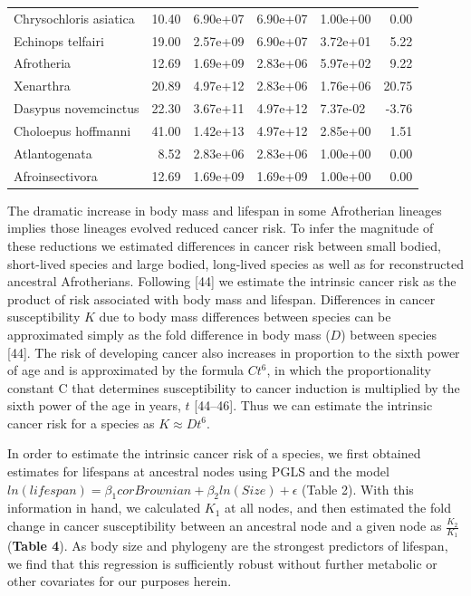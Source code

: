 \documentclass[]{elsarticle} %
\begin{document}
\begin{table}
{\begin{tabular}[t]{lrlllr}
Chrysochloris asiatica & 10.40 & 6.90e+07 & 6.90e+07 & 1.00e+00 & 0.00\\
Echinops telfairi & 19.00 & 2.57e+09 & 6.90e+07 & 3.72e+01 & 5.22\\
Afrotheria & 12.69 & 1.69e+09 & 2.83e+06 & 5.97e+02 & 9.22\\
Xenarthra & 20.89 & 4.97e+12 & 2.83e+06 & 1.76e+06 & 20.75\\
\addlinespace
Dasypus novemcinctus & 22.30 & 3.67e+11 & 4.97e+12 & 7.37e-02 & -3.76\\
Choloepus hoffmanni & 41.00 & 1.42e+13 & 4.97e+12 & 2.85e+00 & 1.51\\
Atlantogenata & 8.52 & 2.83e+06 & 2.83e+06 & 1.00e+00 & 0.00\\
Afroinsectivora & 12.69 & 1.69e+09 & 1.69e+09 & 1.00e+00 & 0.00\\
\bottomrule
\end{tabular}}
\end{table}

The dramatic increase in body mass and lifespan in some Afrotherian
lineages implies those lineages evolved reduced cancer risk. To infer
the magnitude of these reductions we estimated differences in cancer
risk between small bodied, short-lived species and large bodied,
long-lived species as well as for reconstructed ancestral Afrotherians.
Following {[}44{]} we estimate the intrinsic cancer risk as the product
of risk associated with body mass and lifespan. Differences in cancer
susceptibility \(K\) due to body mass differences between species can be
approximated simply as the fold difference in body mass (\(D\)) between
species {[}44{]}. The risk of developing cancer also increases in
proportion to the sixth power of age and is approximated by the formula
\(Ct^6\), in which the proportionality constant C that determines
susceptibility to cancer induction is multiplied by the sixth power of
the age in years, \(t\) {[}44--46{]}. Thus we can estimate the intrinsic
cancer risk for a species as \(K \approx Dt^6\).

In order to estimate the intrinsic cancer risk of a species, we first
obtained estimates for lifespans at ancestral nodes using PGLS and the
model
\(ln(lifespan) = \beta_{1}corBrownian +\beta_{2}ln(Size) + \epsilon\)
(Table 2). With this information in hand, we calculated \(K_{1}\) at all
nodes, and then estimated the fold change in cancer susceptibility
between an ancestral node and a given node as \(\frac{K_{2}}{K_{1}}\)
(\textbf{Table 4}). As body size and phylogeny are the strongest
predictors of lifespan, we find that this regression is sufficiently
robust without further metabolic or other covariates for our purposes
herein.
\end{document}
